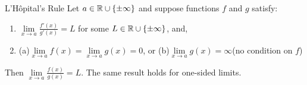 \goodbreak

\begin{thm}{L'Hôpital's Rule}{}
	Let $a\in\mathbb{R}\cup\{\pm\infty\}$ and suppose functions $f$ and $g$ satisfy:
	\begin{enumerate}
	  \item $\lim\limits_{x\to a}\frac{f'(x)}{g'(x)}=L$ for some $L\in\mathbb{R}\cup\{\pm\infty\}$, \space and,
	  \item (a)\space\space $\lim\limits_{x\to a}f(x)=\lim\limits_{x\to a} g(x)=0$,
	  \quad or\quad 
	  (b)\space\space $\lim\limits_{x\to a}g(x)=\infty$\space\space (no condition on $f$)
	\end{enumerate}
	Then $\lim\limits_{x\to a}\frac{f(x)}{g(x)}=L$. The same result holds for one-sided limits.
\end{thm}


